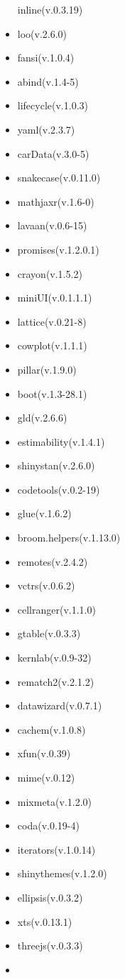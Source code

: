 \documentclass[
]{article}
\begin{document}
\begin{itemize}
  inline(v.0.3.19)
\item
  loo(v.2.6.0)
\item
  fansi(v.1.0.4)
\item
  abind(v.1.4-5)
\item
  lifecycle(v.1.0.3)
\item
  yaml(v.2.3.7)
\item
  carData(v.3.0-5)
\item
  snakecase(v.0.11.0)
\item
  mathjaxr(v.1.6-0)
\item
  lavaan(v.0.6-15)
\item
  promises(v.1.2.0.1)
\item
  crayon(v.1.5.2)
\item
  miniUI(v.0.1.1.1)
\item
  lattice(v.0.21-8)
\item
  cowplot(v.1.1.1)
\item
  pillar(v.1.9.0)
\item
  boot(v.1.3-28.1)
\item
  gld(v.2.6.6)
\item
  estimability(v.1.4.1)
\item
  shinystan(v.2.6.0)
\item
  codetools(v.0.2-19)
\item
  glue(v.1.6.2)
\item
  broom.helpers(v.1.13.0)
\item
  remotes(v.2.4.2)
\item
  vctrs(v.0.6.2)
\item
  cellranger(v.1.1.0)
\item
  gtable(v.0.3.3)
\item
  kernlab(v.0.9-32)
\item
  rematch2(v.2.1.2)
\item
  datawizard(v.0.7.1)
\item
  cachem(v.1.0.8)
\item
  xfun(v.0.39)
\item
  mime(v.0.12)
\item
  mixmeta(v.1.2.0)
\item
  coda(v.0.19-4)
\item
  iterators(v.1.0.14)
\item
  shinythemes(v.1.2.0)
\item
  ellipsis(v.0.3.2)
\item
  xts(v.0.13.1)
\item
  threejs(v.0.3.3)
\item

\end{itemize}
\end{document}
